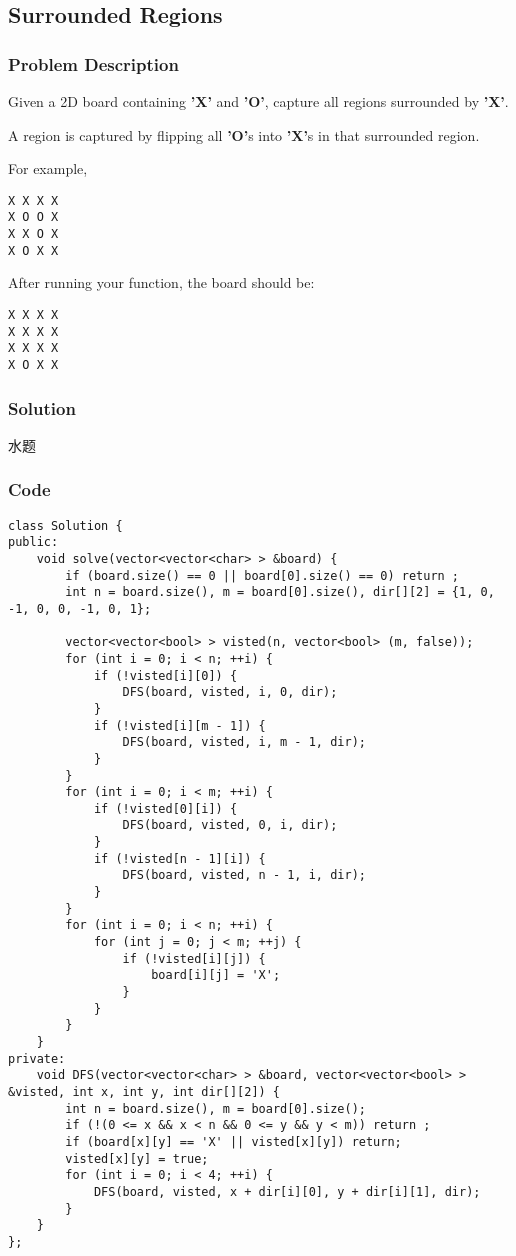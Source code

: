 \documentclass[courier]{article}
\begin{document}
\begin{CJK*}{UTF8}{gkai}
\subsection{ Surrounded Regions }

\subsubsection*{Problem Description}
Given a 2D board containing \textbf{'X'} and \textbf{'O'}, capture all regions surrounded by \textbf{'X'}.

A region is captured by flipping all \textbf{'O'}s into \textbf{'X'}s in that surrounded region.

For example,


\begin{verbatim}
X X X X
X O O X
X X O X
X O X X
\end{verbatim}

After running your function, the board should be:
\begin{verbatim}
X X X X
X X X X
X X X X
X O X X
\end{verbatim}



\subsubsection*{Solution}
水题

\subsubsection*{Code}
\begin{lstlisting}
class Solution {
public:
    void solve(vector<vector<char> > &board) {
        if (board.size() == 0 || board[0].size() == 0) return ;
        int n = board.size(), m = board[0].size(), dir[][2] = {1, 0, -1, 0, 0, -1, 0, 1};
        
        vector<vector<bool> > visted(n, vector<bool> (m, false));
        for (int i = 0; i < n; ++i) {
            if (!visted[i][0]) {
                DFS(board, visted, i, 0, dir);
            }
            if (!visted[i][m - 1]) {
                DFS(board, visted, i, m - 1, dir);
            }
        }
        for (int i = 0; i < m; ++i) {
            if (!visted[0][i]) {
                DFS(board, visted, 0, i, dir);
            }
            if (!visted[n - 1][i]) {
                DFS(board, visted, n - 1, i, dir);
            }
        }
        for (int i = 0; i < n; ++i) {
            for (int j = 0; j < m; ++j) {
                if (!visted[i][j]) {
                    board[i][j] = 'X';
                }
            }
        }
    }
private:
    void DFS(vector<vector<char> > &board, vector<vector<bool> > &visted, int x, int y, int dir[][2]) {
        int n = board.size(), m = board[0].size();
        if (!(0 <= x && x < n && 0 <= y && y < m)) return ;
        if (board[x][y] == 'X' || visted[x][y]) return;
        visted[x][y] = true;
        for (int i = 0; i < 4; ++i) {
            DFS(board, visted, x + dir[i][0], y + dir[i][1], dir);
        }
    }
}; 
\end{lstlisting}



\end{CJK*}
\end{document}
